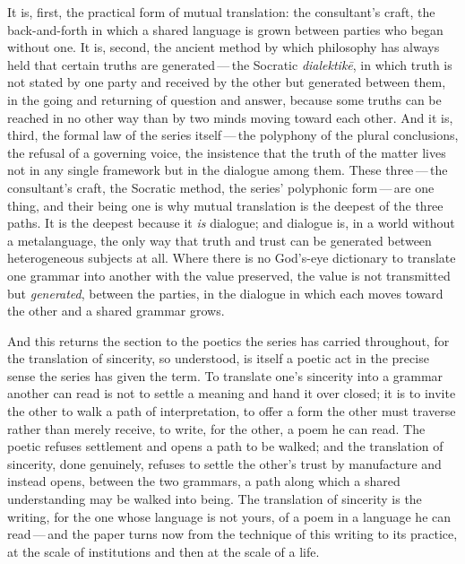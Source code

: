It is, first, the practical form of mutual translation: the consultant's craft, the back-and-forth in which a shared language is grown between parties who began without one. It is, second, the ancient method by which philosophy has always held that certain truths are generated\,---\,the Socratic \emph{dialektik\=e}, in which truth is not stated by one party and received by the other but generated between them, in the going and returning of question and answer, because some truths can be reached in no other way than by two minds moving toward each other. And it is, third, the formal law of the series itself\,---\,the polyphony of the plural conclusions, the refusal of a governing voice, the insistence that the truth of the matter lives not in any single framework but in the dialogue among them. These three\,---\,the consultant's craft, the Socratic method, the series' polyphonic form\,---\,are one thing, and their being one is why mutual translation is the deepest of the three paths. It is the deepest because it \emph{is} dialogue; and dialogue is, in a world without a metalanguage, the only way that truth and trust can be generated between heterogeneous subjects at all. Where there is no God's-eye dictionary to translate one grammar into another with the value preserved, the value is not transmitted but \emph{generated}, between the parties, in the dialogue in which each moves toward the other and a shared grammar grows. 

And this returns the section to the poetics the series has carried throughout, for the translation of sincerity, so understood, is itself a poetic act in the precise sense the series has given the term. To translate one's sincerity into a grammar another can read is not to settle a meaning and hand it over closed; it is to invite the other to walk a path of interpretation, to offer a form the other must traverse rather than merely receive, to write, for the other, a poem he can read. The poetic refuses settlement and opens a path to be walked; and the translation of sincerity, done genuinely, refuses to settle the other's trust by manufacture and instead opens, between the two grammars, a path along which a shared understanding may be walked into being. The translation of sincerity is the writing, for the one whose language is not yours, of a poem in a language he can read\,---\,and the paper turns now from the technique of this writing to its practice, at the scale of institutions and then at the scale of a life.

